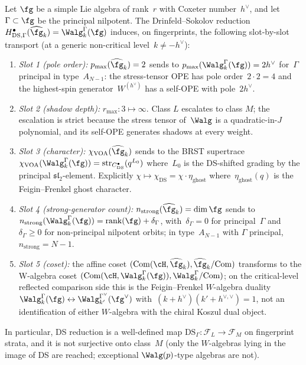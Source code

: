 \begin{theorem}
\label{thm:DS-fingerprint-transport}
\ClaimStatusProvedHere
Let $\fg$ be a simple Lie algebra of rank~$r$ with Coxeter
number~$h^\vee$, and let~$\Gamma \subset \fg$ be the principal
nilpotent. The Drinfeld--Sokolov reduction
$H^\bullet_{\mathrm{DS},\Gamma}(\widehat{\fg}_k) = \Walg^\Gamma_k(\fg)$
induces, on fingerprints, the following slot-by-slot transport
\textup{(}at a generic non-critical level~$k\neq -h^\vee$\textup{)}:
\begin{enumerate}[label=\textup{(\roman*)},leftmargin=*]
\item \emph{Slot 1 (pole order):} $p_{\max}(\widehat{\fg}_k) = 2$ sends
to $p_{\max}(\Walg^\Gamma_k(\fg)) = 2h^\vee$ for~$\Gamma$ principal
in type~$A_{N-1}$: the stress-tensor OPE has pole order~$2\cdot 2 = 4$
and the highest-spin generator~$W^{(h^\vee)}$ has a self-OPE with
pole~$2h^\vee$.
\item \emph{Slot 2 (shadow depth):} $r_{\max}\colon 3 \mapsto \infty$.
Class $L$ escalates to class $M$; the escalation is strict because the
stress tensor of~$\Walg$ is a quadratic-in-$J$ polynomial, and its
self-OPE generates shadows at every weight.
\item \emph{Slot 3 (character):} $\chi_{\mathrm{VOA}}(\widehat{\fg}_k)$
sends to the BRST supertrace
$\chi_{\mathrm{VOA}}(\Walg^\Gamma_k(\fg)) = \operatorname{str}_{C^\bullet_{\mathrm{DS}}}(q^{L_0})$
where~$L_0$ is the DS-shifted grading by the principal
$\mathfrak{sl}_2$-element. Explicitly
$\chi \mapsto \chi_{\mathrm{DS}} = \chi\cdot\eta_{\mathrm{ghost}}$
where~$\eta_{\mathrm{ghost}}(q)$ is the Feigin--Frenkel ghost
character.
\item \emph{Slot 4 (strong-generator count):}
$n_{\mathrm{strong}}(\widehat{\fg}_k) = \dim\fg$ sends to
$n_{\mathrm{strong}}(\Walg^\Gamma_k(\fg)) = \mathrm{rank}(\fg) + \delta_\Gamma$,
with~$\delta_\Gamma = 0$ for principal~$\Gamma$ and $\delta_\Gamma \geq 0$
for non-principal nilpotent orbits; in type~$A_{N-1}$ with
$\Gamma$ principal, $n_{\mathrm{strong}} = N-1$.
\item \emph{Slot 5 (coset):} the affine coset
$(\mathrm{Com}(\cH, \widehat{\fg}_k), \widehat{\fg}_k/\mathrm{Com})$
transforms to the W-algebra coset
$(\mathrm{Com}(\cH, \Walg^\Gamma_k(\fg)), \Walg^\Gamma_k/\mathrm{Com})$;
on the critical-level reflected comparison side this is the
Feigin--Frenkel \(W\)-algebra duality
$\Walg^\Gamma_k(\fg) \leftrightarrow \Walg^{\Gamma^\vee}_{k'}(\fg^\vee)$
with~$(k + h^\vee)(k' + h^{\vee,\vee}) = 1$, not an identification
of either \(W\)-algebra with the chiral Koszul dual object.
\end{enumerate}
In particular, DS reduction is a well-defined map
$\mathrm{DS}_\Gamma\colon \mathcal{F}_L \to \mathcal{F}_M$ on
fingerprint strata, and it is not surjective onto class~$M$ (only
the $W$-algebras lying in the image of DS are reached; exceptional
$\Walg(p)$-type algebras are not).
\end{theorem}


